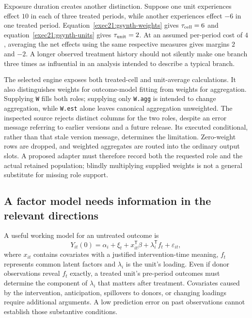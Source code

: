 Exposure duration creates another distinction. Suppose one unit experiences
effect $10$ in each of three treated periods, while another experiences
effect $-6$ in one treated period. Equation~\eqref{exec21:gsynth-weights}
gives $\tau_{\rm cell}=6$ and equation~\eqref{exec21:gsynth-units} gives
$\tau_{\rm unit}=2$. At an assumed per-period cost of $4$, averaging the
net effects using the same respective measures gives margins $2$ and $-2$.
A longer observed treatment history should not silently make one branch
three times as influential in an analysis intended to describe a typical
branch. \cite{exec21_gsynth_reference}

The selected engine exposes both treated-cell and unit-average calculations.
It also distinguishes weights for outcome-model fitting from weights for
aggregation. Supplying \texttt{W} fills both roles; supplying only
\texttt{W.agg} is intended to change aggregation, while \texttt{W.est}
alone leaves canonical aggregation unweighted. The inspected source rejects
distinct columns for the two roles, despite an error message referring to
earlier versions and a future release. Its executed conditional, rather than
that stale version message, determines the limitation. Zero-weight rows are
dropped, and weighted aggregates are routed into the ordinary output slots.
A proposed adapter must therefore record both the requested role and the
actual retained population; blindly multiplying supplied weights is not a
general substitute for missing role support. \cite{exec21_gsynth_engine}

\subsection{A factor model needs information in the relevant directions}
\label{exec21:gsynth-rank}

A useful working model for an untreated outcome is
\begin{equation}
\label{exec21:gsynth-factor}
 Y_{it}(0)=\alpha_i+\xi_t+x_{it}^{\mathsf T}\beta
                     +\lambda_i^{\mathsf T}f_t+\varepsilon_{it},
\end{equation}
where $x_{it}$ contains covariates with a justified intervention-time meaning,
$f_t$ represents common latent factors and $\lambda_i$ is the unit's loading.
Even if donor observations reveal $f_t$ exactly, a treated unit's pre-period
outcomes must determine the component of $\lambda_i$ that matters after
treatment. Covariates caused by the intervention, anticipation, spillovers
to donors, or changing loadings require additional arguments. A low prediction
error on past observations cannot establish those substantive conditions.

